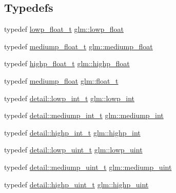 \subsection*{Typedefs}
\begin{DoxyCompactItemize}
\item 
typedef \hyperlink{namespaceglm_a0a43b64238afac063f27ee7620205bf2}{lowp\+\_\+float\+\_\+t} \hyperlink{group__core__precision_ga2887fbc729ac5c1c5caeb7cd57a7145c}{glm\+::lowp\+\_\+float}
\item 
typedef \hyperlink{namespaceglm_aec127979a2b6edbf05b485cb4e8c47cc}{mediump\+\_\+float\+\_\+t} \hyperlink{group__core__precision_gac785826c039fe6c97c03b37c81c1a68e}{glm\+::mediump\+\_\+float}
\item 
typedef \hyperlink{namespaceglm_af6f4e45ae06ae3f979dd30cafe7d07c6}{highp\+\_\+float\+\_\+t} \hyperlink{group__core__precision_ga3d443a093adc053638ed7f81c5bfe300}{glm\+::highp\+\_\+float}
\item 
typedef \hyperlink{group__core__precision_gac785826c039fe6c97c03b37c81c1a68e}{mediump\+\_\+float} \hyperlink{group__core__precision_gae01b87f81bd15327230bf1b47c482b24}{glm\+::float\+\_\+t}
\item 
typedef \hyperlink{namespaceglm_1_1detail_a030a8128e369fc1f9c7982dc68a78ba7}{detail\+::lowp\+\_\+int\+\_\+t} \hyperlink{group__core__precision_ga4681244bf4a184734f03aa9df4e3d288}{glm\+::lowp\+\_\+int}
\item 
typedef \hyperlink{namespaceglm_1_1detail_aede0757f19204d1d44f716b3dd66d13c}{detail\+::mediump\+\_\+int\+\_\+t} \hyperlink{group__core__precision_ga2a3dcbcd7f4e17663d393a12061ac6ac}{glm\+::mediump\+\_\+int}
\item 
typedef \hyperlink{namespaceglm_1_1detail_a74c48e9deafcc33db998a4ee62da8d6e}{detail\+::highp\+\_\+int\+\_\+t} \hyperlink{group__core__precision_gaafed5240eb0a43328cb75faf5fb0a8c2}{glm\+::highp\+\_\+int}
\item 
typedef \hyperlink{namespaceglm_1_1detail_ad59c4581ad8ce0c3ef6146edaa7e15dc}{detail\+::lowp\+\_\+uint\+\_\+t} \hyperlink{group__core__precision_ga8077c90f2c87e419ea6c273157dcc1fc}{glm\+::lowp\+\_\+uint}
\item 
typedef \hyperlink{namespaceglm_1_1detail_a98f572e92099cc1b5740f1ccf1c80f8d}{detail\+::mediump\+\_\+uint\+\_\+t} \hyperlink{group__core__precision_ga08ae38ad78ade3539fdd1d25052b8c51}{glm\+::mediump\+\_\+uint}
\item 
typedef \hyperlink{namespaceglm_1_1detail_a994c05c8a976cc902a7cd193ad36bbba}{detail\+::highp\+\_\+uint\+\_\+t} \hyperlink{group__core__precision_gabfd1cf11193324a5f77d3831b6ac3205}{glm\+::highp\+\_\+uint}

\end{DoxyCompactItemize}
